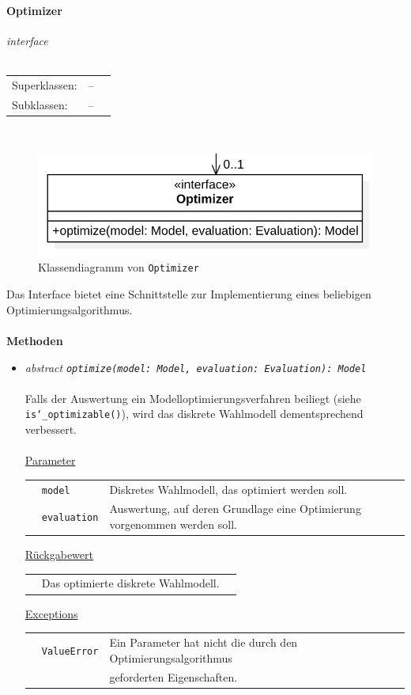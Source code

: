 \documentclass{article}
\newcommand{\classheader}[2][]{\paragraph{#2}
\mbox{}\textit{#1}\\\\}
\begin{document}
\newpage
\classheader[\flqq{}interface\frqq]{Optimizer}\label{cls:Optimizer}
\begin{tabular}{lll}
 Superklassen: & --\\
 Subklassen: & --
\end{tabular}\\
\begin{figure}[H]%
    \centering
    \includegraphics[width=13cm]{entwurf/Entwurf_dokument/img/cls/model/Optimizer.png}
    \caption{Klassendiagramm von \texttt{Optimizer}}
\end{figure}

Das Interface bietet eine Schnittstelle zur Implementierung eines beliebigen Optimierungsalgorithmus.
\\\\

\textbf{Methoden}
\begin{itemize}\setlength\itemsep{3em}
\item \textit{\flqq{}abstract\frqq} \texttt{\textit{optimize(model: Model, evaluation: Evaluation): Model}}\\\\
Falls der Auswertung ein Modelloptimierungsverfahren beiliegt (siehe \texttt{is\char`_optimizable()}), wird das diskrete Wahlmodell dementsprechend verbessert.\\\\
\underline{Parameter}\\
\begin{tabular}{lll}
 & \texttt{model} & Diskretes Wahlmodell, das optimiert werden soll.\\
 & \texttt{evaluation} & Auswertung, auf deren Grundlage eine Optimierung vorgenommen werden soll.
\end{tabular}

\underline{Rückgabewert}\\
\begin{tabular}{lll}
 & Das optimierte diskrete Wahlmodell.\\
\end{tabular}

\underline{Exceptions}\\
\begin{tabular}{lll}
 & \texttt{ValueError} & Ein Parameter hat nicht die durch den Optimierungsalgorithmus\\
 && geforderten Eigenschaften.\\
\end{tabular}
\end{itemize}
\end{document}

